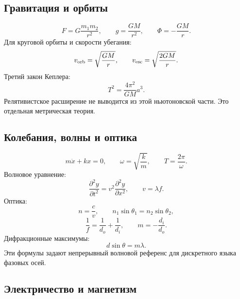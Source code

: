 \documentclass[11pt]{article}
\begin{document}
\subsection{Гравитация и орбиты}

\begin{equation}
    F=G\frac{m_1m_2}{r^2},\qquad
    g=\frac{GM}{r^2},\qquad
    \Phi=-\frac{GM}{r}.
\end{equation}
Для круговой орбиты и скорости убегания:
\begin{equation}
    v_{\rm orb}=\sqrt{\frac{GM}{r}},
    \qquad
    v_{\rm esc}=\sqrt{\frac{2GM}{r}}.
\end{equation}
Третий закон Кеплера:
\begin{equation}
    T^2=\frac{4\pi^2}{GM}a^3.
\end{equation}
Релятивистское расширение не выводится из этой ньютоновской части.  Это
отдельная метрическая теория.

\subsection{Колебания, волны и оптика}

\begin{equation}
    m\ddot{x}+kx=0,\qquad
    \omega=\sqrt{\frac{k}{m}},\qquad
    T=\frac{2\pi}{\omega}.
\end{equation}
Волновое уравнение:
\begin{equation}
    \frac{\partial^2 y}{\partial t^2}
    =
    v^2\frac{\partial^2 y}{\partial x^2},
    \qquad
    v=\lambda f.
\end{equation}
Оптика:
\begin{equation}
    n=\frac{c}{v},\qquad
    n_1\sin\theta_1=n_2\sin\theta_2,
\end{equation}
\begin{equation}
    \frac{1}{f}=\frac{1}{d_o}+\frac{1}{d_i},
    \qquad
    m=-\frac{d_i}{d_o}.
\end{equation}
Дифракционные максимумы:
\begin{equation}
    d\sin\theta=m\lambda.
\end{equation}
Эти формулы задают непрерывный волновой референс для дискретного языка фазовых
осей.

\subsection{Электричество и магнетизм}
\end{document}

